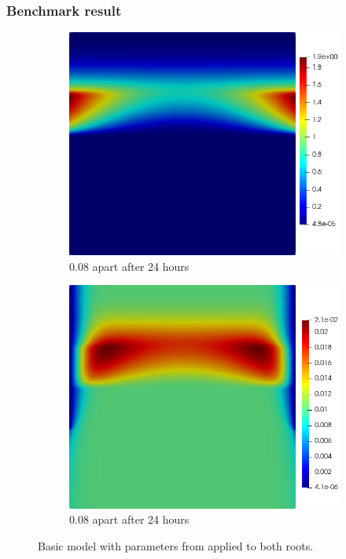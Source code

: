 \documentclass[11pt]{article}
\numberwithin{equation}{section}
\begin{document}
\subsubsection{Benchmark result}
 \begin{figure}[h]
     \centering
     \begin{subfigure}[t]{0.35\textwidth}\centering
     \includegraphics[width=\textwidth]{Figures/testpics/BasicDMA.png}
     \caption{0.08 apart  after 24 hours}
     \end{subfigure}
     \hspace{1cm}
     \begin{subfigure}[t]{0.35\textwidth}\centering
     \includegraphics[width=\textwidth]{Figures/testpics/BasicZn.png}
     \caption{0.08 apart  after 24 hours}
     \end{subfigure}
     \caption{Basic model with parameters from \cite{Ptashnyk-2011} applied to both roots.}
 \end{figure}
\end{document}
